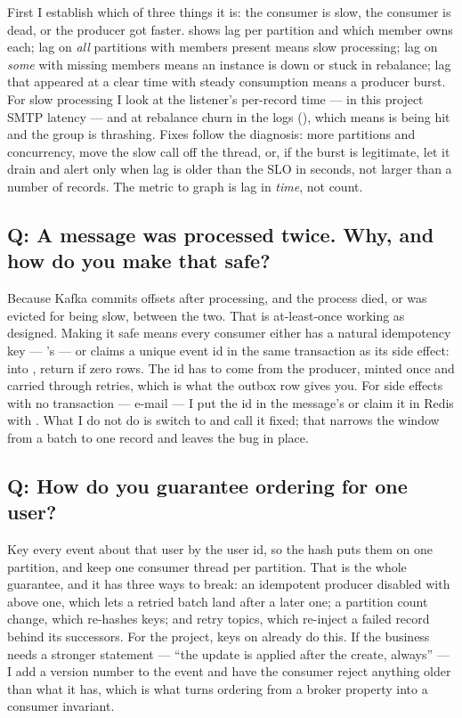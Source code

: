 First I establish which of three things it is: the consumer is slow,
the consumer is dead, or the producer got faster.  shows lag per
partition and which member owns each; lag on \emph{all} partitions with
members present means slow processing; lag on \emph{some} with missing
members means an instance is down or stuck in rebalance; lag that
appeared at a clear time with steady consumption means a producer
burst. For slow processing I look at the listener's per-record time
--- in this project SMTP latency --- and at rebalance churn in the logs
(), which means  is
being hit and the group is thrashing. Fixes follow the diagnosis: more
partitions and concurrency, move the slow call off the thread, or,
if the burst is legitimate, let it drain and alert only when lag is
older than the SLO in seconds, not larger than a number of records. The
metric to graph is lag in \emph{time}, not count.

\subsection*{Q: A message was processed twice. Why, and how do you make that safe?}

Because Kafka commits offsets after processing, and the process died,
or was evicted for being slow, between the two. That is at-least-once
working as designed. Making it safe means every consumer either has a
natural idempotency key --- 's
 --- or claims a unique event id in the same
transaction as its side effect:  into , return if zero rows. The id has
to come from the producer, minted once and carried through retries,
which is what the outbox row gives you. For side effects with no
transaction --- e-mail --- I put the id in the message's
 or claim it in Redis with . What I do
not do is switch to  and call it fixed; that
narrows the window from a batch to one record and leaves the bug in
place.

\subsection*{Q: How do you guarantee ordering for one user?}

Key every event about that user by the user id, so the hash puts them
on one partition, and keep one consumer thread per partition. That is
the whole guarantee, and it has three ways to break: an idempotent
producer disabled with  above one, which lets a
retried batch land after a later one; a partition count change, which
re-hashes keys; and retry topics, which re-inject a failed record
behind its successors. For the project,  keys on
 already do this. If the business needs a stronger
statement --- ``the update is applied after the create, always'' --- I
add a version number to the event and have the consumer reject anything
older than what it has, which is what turns ordering from a broker
property into a consumer invariant.

